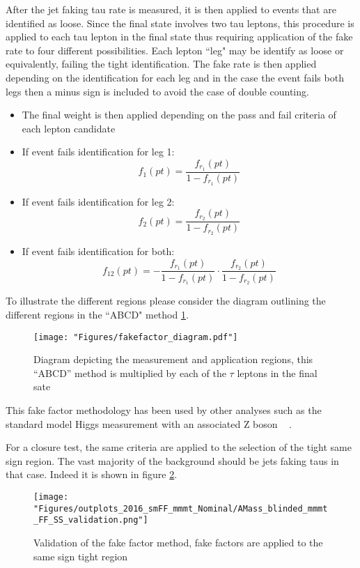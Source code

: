 After the jet faking tau rate is measured, it is then applied to events that are identified as loose. Since the final state involves two tau leptons, this procedure is applied to each tau lepton in the final state thus requiring application of the fake rate to four different possibilities. Each lepton ``leg" may be identify as loose or equivalently, failing the tight identification. The fake rate is then applied depending on the identification for each leg and in the case the event fails both legs then a minus sign is included to avoid the case of double counting. 
\begin{itemize}
\item{The final weight is then 
applied depending on the 
pass and fail criteria of each 
lepton candidate}
\item{If event fails identification for leg 1:\begin{equation}f_1(pt)=\frac{f_{r_1}(pt)}{1-f_{r_1}(pt)}\end{equation}}
\item{If event fails identification for leg 2:\begin{equation}f_2(pt)=\frac{f_{r_2}(pt)}{1-f_{r_2}(pt)}\end{equation}}
\item{If event fails identification for both:\begin{equation}f_{12}(pt)=-\frac{f_{r_1}(pt)}{1-f_{r_1}(pt)}\cdot\frac{f_{r_2}(pt)}{1-f_{r_2}(pt)}\end{equation}}
\end{itemize}


To illustrate the different regions please consider the diagram outlining the different regions in the ``ABCD" method \ref{fig:fakefactor_reg}. 
\begin{figure}[ht!b]
  \texttt{[image: "Figures/fakefactor\_diagram.pdf"]}
    \caption{\label{fig:fakefactor_reg} Diagram depicting the measurement and application regions, this ``ABCD'' method is multiplied by each of the $\tau$ leptons in the final sate}
\end{figure}

This fake factor methodology has been used by other analyses such as the standard model Higgs measurement with an associated Z boson ~\cite{CMS-PAS-HIG-19-010} . 

For a closure test, the same criteria are applied to the selection of the tight same sign region. The vast majority of the background should be jets faking taus in that case. Indeed it is shown in figure \ref{fig:fakefactor_validation}.
  
\begin{figure}[ht!b]
  \texttt{[image: "Figures/outplots\_2016\_smFF\_mmmt\_Nominal/AMass\_blinded\_mmmt\_FF\_SS\_validation.png"]}
    \caption{\label{fig:fakefactor_validation} Validation of the fake factor method, fake factors are applied to the same sign tight region}
\end{figure}
